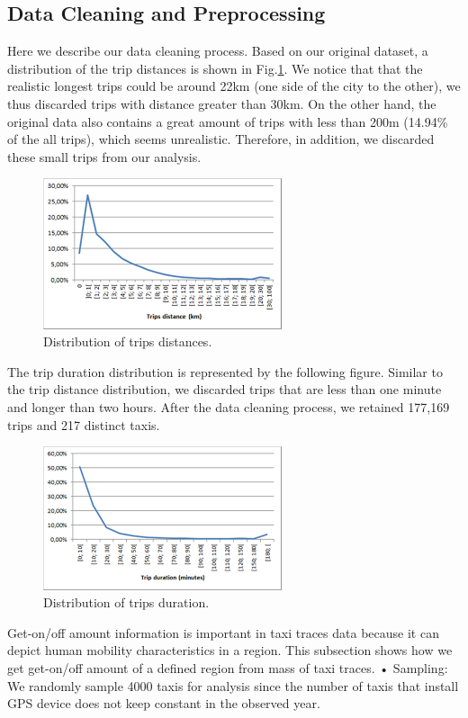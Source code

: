 \documentclass[a4paper, 10pt, conference]{ieeeconf}      %
\begin{document}
\subsection{Data Cleaning and Preprocessing}
Here we describe our data cleaning process. Based on our original dataset, a distribution of the trip distances is shown in Fig.\ref{fig:my_png_3}. We notice that that the realistic longest trips could be around 22km (one side of the city to the other), we thus discarded trips with distance greater than 30km. On the other hand, the original data also contains a great amount of trips with less than 200m (14.94\% of the all trips), which seems unrealistic. Therefore, in addition, we discarded these small trips from our analysis.  
\begin{figure}[ht]
    \centering
    \includegraphics[width=7cm]{fig/png3.png}
    \caption{ Distribution of trips distances. }
    \label{fig:my_png_3}
\end{figure}
The trip duration distribution is represented by the following figure. Similar to the trip distance distribution, we discarded trips that are less than one minute and longer than two hours. After the data cleaning process, we retained 177,169 trips and 217 distinct taxis. 
 \begin{figure}[ht]
    \centering
    \includegraphics[width=7cm]{fig/png4.png}
    \caption{Distribution of trips duration. }
    \label{fig:my_png_4}
\end{figure}


Get-on/off amount information is important in taxi traces data because it can depict human mobility characteristics in a region. This subsection shows how we get get-on/off amount of a defined region from mass of taxi traces. • Sampling: We randomly sample 4000 taxis for analysis since the number of taxis that install GPS device does not keep constant in the observed year.
\end{document}
